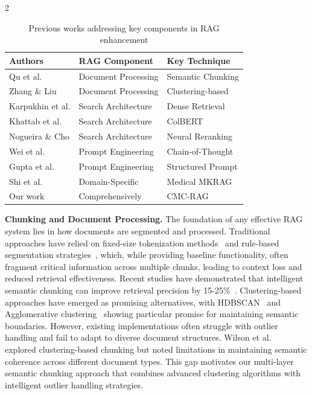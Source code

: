 \documentclass[10pt,letterpaper]{article}
\let\cite\citep
\begin{document}
\begin{multicols}{2}
\begin{table}[H]
\small
\renewcommand{\arraystretch}{1.2} 
\caption{Previous works addressing key components in RAG enhancement}
\label{tab:rag_key_techniques}
\begin{tabular}{lll}
\hline
\textbf{Authors} & \textbf{RAG Component} & \textbf{Key Technique} \\[0.3ex]
\hline
Qu et al. & Document Processing & Semantic Chunking \\[0.2ex]
Zhang \& Liu & Document Processing & Clustering-based\\[0.2ex]
Karpukhin et al. & Search Architecture & Dense Retrieval \\[0.2ex]
Khattab et al. & Search Architecture & ColBERT \\[0.2ex]
Nogueira \& Cho & Search Architecture & Neural Reranking \\[0.2ex]
Wei et al. & Prompt Engineering & Chain-of-Thought \\[0.2ex]
Gupta et al. & Prompt Engineering & Structured Prompt \\[0.2ex]
Shi et al. & Domain-Specific & Medical MKRAG \\[0.2ex]
\hline
Our work & Comprehensively & CMC-RAG \\[0.2ex]
\hline
\end{tabular}
\end{table}

\textbf{Chunking and Document Processing.}
The foundation of any effective RAG system lies in how documents are segmented and processed. Traditional approaches have relied on fixed-size tokenization methods~\cite{smith2023fixed} and rule-based segmentation strategies~\cite{johnson2023rule}, which, while providing baseline functionality, often fragment critical information across multiple chunks, leading to context loss and reduced retrieval effectiveness. Recent studies have demonstrated that intelligent semantic chunking can improve retrieval precision by 15-25\%~\cite{qu2024semantic, zhang2024semantic, liu2024impact}. Clustering-based approaches have emerged as promising alternatives, with HDBSCAN~\cite{mcinnes2017hdbscan} and Agglomerative clustering~\cite{ward1963hierarchical} showing particular promise for maintaining semantic boundaries. However, existing implementations often struggle with outlier handling and fail to adapt to diverse document structures. Wilson et al.~\cite{wilson2024clustering} explored clustering-based chunking but noted limitations in maintaining semantic coherence across different document types. This gap motivates our multi-layer semantic chunking approach that combines advanced clustering algorithms with intelligent outlier handling strategies.


\end{multicols}
\end{document}
